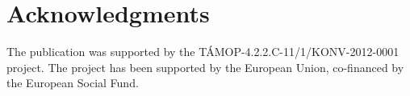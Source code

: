 \documentclass{acm_proc_article-me}
\begin{document}


\section{Acknowledgments}

The publication was supported by the T\'AMOP-4.2.2.C-11/1/KONV-2012-0001 project. The project has been supported by the European Union, co-financed by the European Social Fund.



\end{document}
